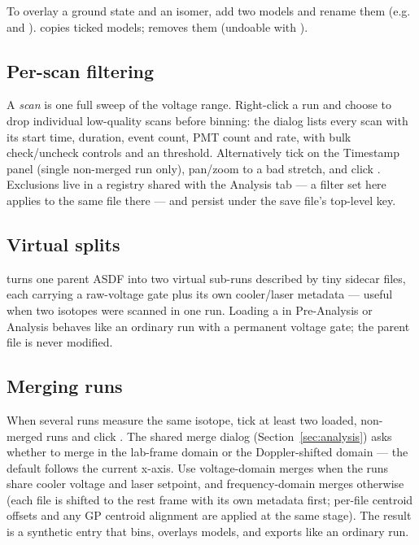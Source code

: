 To overlay a ground state and an isomer, add two models and rename
them (e.g.\  and ). 
copies ticked models;  removes them (undoable
with ).

\subsection{Per-scan filtering}
\label{sec:pa_scanfilter}

A \emph{scan} is one full sweep of the voltage range. Right-click a
run and choose  to drop individual low-quality
scans before binning: the dialog lists every scan with its start
time, duration, event count, PMT count and rate, with bulk
check/uncheck controls and an  threshold.
Alternatively tick  on the Timestamp panel (single
non-merged run only), pan/zoom to a bad stretch, and click
. Exclusions live in a registry shared
with the Analysis tab --- a filter set here applies to the same file
there --- and persist under the save file's top-level
 key.

\subsection{Virtual splits}

 turns one parent ASDF into
two virtual sub-runs described by tiny  sidecar files,
each carrying a raw-voltage gate plus its own cooler/laser metadata
--- useful when two isotopes were scanned in one run. Loading a
 in Pre-Analysis or Analysis behaves like an ordinary
run with a permanent voltage gate; the parent file is never
modified.

\subsection{Merging runs}

When several runs measure the same isotope, tick at least two loaded,
non-merged runs and click . The shared merge
dialog (Section~\ref{sec:analysis}) asks whether to merge in the
lab-frame  domain or the Doppler-shifted 
domain --- the default follows the current x-axis. Use voltage-domain
merges when the runs share cooler voltage and laser setpoint, and
frequency-domain merges otherwise (each file is shifted to the rest
frame with its own metadata first; per-file centroid offsets and any
GP centroid alignment are applied at the same stage). The result is a
synthetic entry that bins, overlays models, and exports like an
ordinary run.

